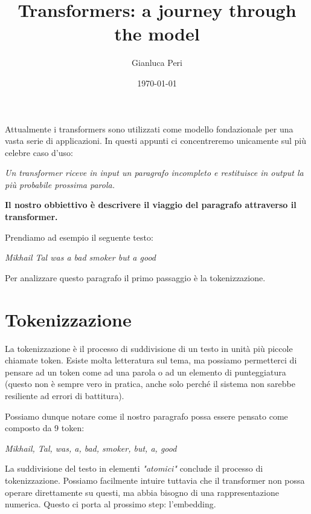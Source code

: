 

\title{
    \textbf{Transformers: a journey through the model}
}

\author{Gianluca Peri}
\date{\today}



\maketitle

Attualmente i transformers sono utilizzati come modello fondazionale per una vasta serie di applicazioni.
In questi appunti ci concentreremo unicamente sul più celebre caso d'uso:

\begin{center}
    \textit{Un transformer riceve in input un paragrafo incompleto e restituisce in output la più probabile prossima parola.}
\end{center}

\textbf{Il nostro obbiettivo è descrivere il viaggio del paragrafo attraverso il transformer.}

Prendiamo ad esempio il seguente testo:

\begin{center}
    \textit{Mikhail Tal was a bad smoker but a good}
\end{center}

Per analizzare questo paragrafo il primo passaggio è la tokenizzazione.

\section{Tokenizzazione}

La tokenizzazione è il processo di suddivisione di un testo in unità più piccole chiamate token. Esiste molta letteratura sul tema, ma possiamo permetterci di pensare ad un token come ad una parola o ad un elemento di punteggiatura (questo non è sempre vero in pratica, anche solo perché il sistema non sarebbe resiliente ad errori di battitura).

Possiamo dunque notare come il nostro paragrafo possa essere pensato come composto da 9 token:

\begin{center}
    \textit{Mikhail, Tal, was, a, bad, smoker, but, a, good}
\end{center}

La suddivisione del testo in elementi \textit{"atomici"} conclude il processo di tokenizzazione. Possiamo facilmente intuire tuttavia che il transformer non possa operare direttamente su questi, ma abbia bisogno di una rappresentazione numerica. Questo ci porta al prossimo step: l'embedding.

